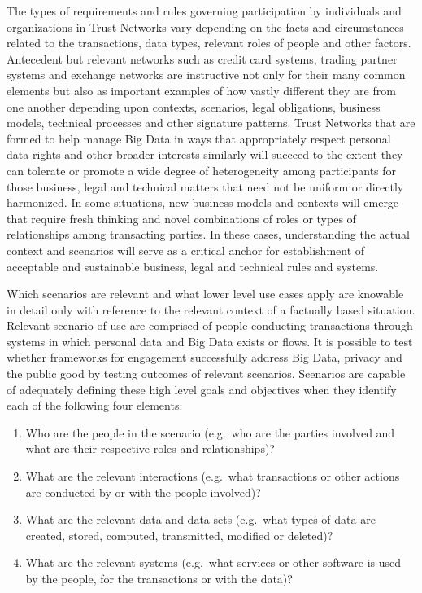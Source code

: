 The types of requirements and rules governing participation by individuals and organizations in Trust Networks vary depending on the facts and circumstances related to the transactions, data types, relevant roles of people and other factors.  Antecedent but relevant networks such as credit card systems, trading partner systems and exchange networks are instructive not only for their many common elements but also as important examples of how vastly different they are from one another depending upon contexts, scenarios, legal obligations, business models, technical processes and other signature patterns.  Trust Networks that are formed to help manage Big Data in ways that appropriately respect personal data rights and other broader interests similarly will succeed to the extent they can tolerate or promote a wide degree of heterogeneity among participants for those business, legal and technical matters that need not be uniform or directly harmonized.  In some situations, new business models and contexts will emerge that require fresh thinking and novel combinations of roles or types of relationships among transacting parties.  In these cases, understanding the actual context and scenarios will serve as a critical anchor for establishment of acceptable and sustainable business, legal and technical rules and systems.  

Which scenarios are relevant and what lower level use cases apply are knowable in detail only with reference to the relevant context of a factually based situation.  Relevant scenario of use are comprised of people conducting transactions through systems in which personal data and Big Data exists or flows. It is possible to test whether frameworks for engagement successfully address Big Data, privacy and the public good by testing outcomes of relevant scenarios.  Scenarios are capable of adequately defining these high level goals and objectives when they identify each of the following four elements:  

\begin{enumerate}
\item Who are the people in the scenario (e.g.~who are the parties involved and what are their respective roles and relationships)? 
\item What are the relevant interactions (e.g.~what transactions or other actions are conducted by or with the people involved)?
\item What are the relevant data and data sets (e.g.~what types of data are created, stored, computed, transmitted, modified or deleted)?
\item What are the relevant systems (e.g.~what services or other software is used by the people, for the transactions or with the data)? 
\end{enumerate}

